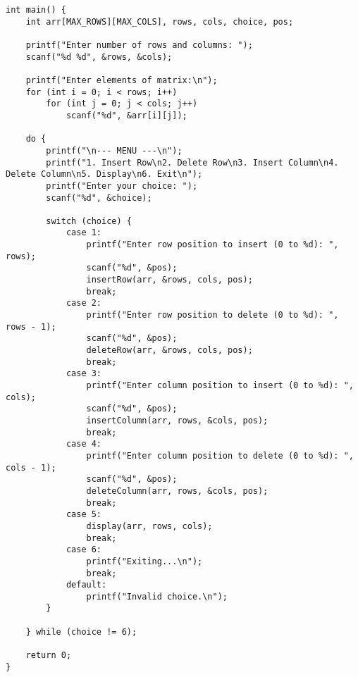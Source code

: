 \documentclass[12pt,a4paper]{article}
\begin{document}
\begin{lstlisting}
int main() {
    int arr[MAX_ROWS][MAX_COLS], rows, cols, choice, pos;

    printf("Enter number of rows and columns: ");
    scanf("%d %d", &rows, &cols);

    printf("Enter elements of matrix:\n");
    for (int i = 0; i < rows; i++)
        for (int j = 0; j < cols; j++)
            scanf("%d", &arr[i][j]);

    do {
        printf("\n--- MENU ---\n");
        printf("1. Insert Row\n2. Delete Row\n3. Insert Column\n4. Delete Column\n5. Display\n6. Exit\n");
        printf("Enter your choice: ");
        scanf("%d", &choice);

        switch (choice) {
            case 1:
                printf("Enter row position to insert (0 to %d): ", rows);
                scanf("%d", &pos);
                insertRow(arr, &rows, cols, pos);
                break;
            case 2:
                printf("Enter row position to delete (0 to %d): ", rows - 1);
                scanf("%d", &pos);
                deleteRow(arr, &rows, cols, pos);
                break;
            case 3:
                printf("Enter column position to insert (0 to %d): ", cols);
                scanf("%d", &pos);
                insertColumn(arr, rows, &cols, pos);
                break;
            case 4:
                printf("Enter column position to delete (0 to %d): ", cols - 1);
                scanf("%d", &pos);
                deleteColumn(arr, rows, &cols, pos);
                break;
            case 5:
                display(arr, rows, cols);
                break;
            case 6:
                printf("Exiting...\n");
                break;
            default:
                printf("Invalid choice.\n");
        }

    } while (choice != 6);

    return 0;
}
\end{lstlisting}
\end{document}

